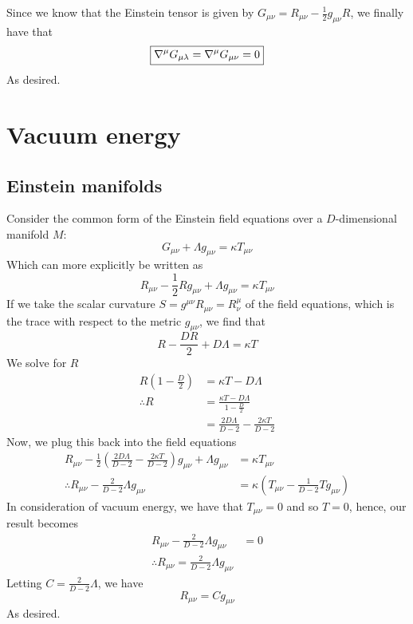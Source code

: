 \documentclass{article}
\begin{document}
		Since we know that the Einstein tensor is given by $G_{\mu\nu} = R_{\mu\nu} - \frac12 g_{\mu\nu}R$, we finally have that
		$$ \boxed{\nabla^\mu G_{\mu\lambda} = \nabla^\mu G_{\mu\nu} = 0}$$
		As desired.
		
	\pagebreak
	\section{Vacuum energy}
		\subsection{Einstein manifolds}
		Consider the common form of the Einstein field equations over a $D$-dimensional manifold $M$:
		$$ G_{\mu\nu} + \Lambda g_{\mu\nu} = \kappa T_{\mu\nu}$$
		Which can more explicitly be written as
		$$ R_{\mu\nu} - \frac12 R g_{\mu\nu} + \Lambda g_{\mu\nu} = \kappa T_{\mu\nu}$$
		If we take the scalar curvature $S = g^{\mu\nu}R_{\mu\nu} = R_\nu^\mu$ of the field equations, which is the trace with respect to the metric $g_{\mu\nu}$, we find that
		$$ R - \frac{DR}{2} + D\Lambda = \kappa T$$
		We solve for $R$
		\begin{align*}
			R \left(1-\frac{D}{2}\right) &= \kappa T - D \Lambda \\
			\therefore R &= \frac{\kappa T - D \Lambda}{1 - \frac{D}{2}} \\
			&= \frac{2D\Lambda}{D-2} - \frac{2\kappa T}{D-2}
		\end{align*}
		Now, we plug this back into the field equations
		\begin{align*}
			 R_{\mu\nu} - \frac12 \left( \frac{2D\Lambda}{D-2} - \frac{2\kappa T}{D-2}\right) g_{\mu\nu} + \Lambda g_{\mu\nu} &= \kappa T_{\mu\nu} \\
			 \therefore R_{\mu\nu} - \frac{2}{D-2} \Lambda g_{\mu\nu} &= \kappa \left( T_{\mu\nu} - \frac{1}{D-2} Tg_{\mu\nu}\right) 
		\end{align*}
		In consideration of vacuum energy, we have that $T_{\mu\nu} = 0$ and so $T=0$, hence, our result becomes
		\begin{align*}
			R_{\mu\nu} - \frac{2}{D-2} \Lambda g_{\mu\nu} &= 0 \\
			\therefore R_{\mu\nu} = \frac{2}{D-2} \Lambda g_{\mu\nu} 
		\end{align*} 
		Letting $C = \frac{2}{D-2} \Lambda$, we have
		$$ \boxed{R_{\mu\nu} = Cg_{\mu\nu}}$$
		As desired.
		
		\pagebreak
\end{document}
